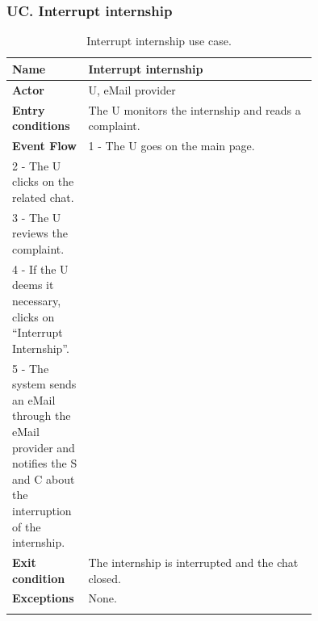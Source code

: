 \subsubsection*{UC\cuc . Interrupt internship}
\begin{center}
    \begin{longtable}{|l|p{0.75\linewidth}|}
        \hline
        \textbf{Name}               & Interrupt internship\\
        \hline
        \textbf{Actor}              & U, eMail provider\\
        \hline
        \textbf{Entry conditions}   & The U monitors the internship and reads a complaint.\\
        \hline
        \textbf{Event Flow}         & 
        1 - The U goes on the main page. \\
        2 - The U clicks on the related chat. \\
        3 - The U reviews the complaint. \\
        4 - If the U deems it necessary, clicks on “Interrupt Internship”. \\
        5 - The system sends an eMail through the eMail provider and notifies the S and C about the interruption of the internship. \\
        \hline
        \textbf{Exit condition}   & The internship is interrupted and the chat closed. \\       
        \hline
        \textbf{Exceptions}       & None. \\
        \hline
        \caption{Interrupt internship use case.}
        \label{tab: interrupt_internship_use_case}
    \end{longtable}
\end{center}


